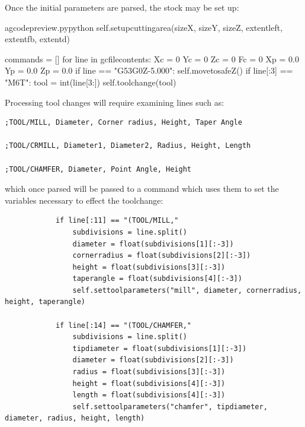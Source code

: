 \documentclass{ltxdoc}
\begin{document}
Once the initial parameters are parsed, the stock may be set up:

\lstset{firstnumber=\thegcpy}
\begin{writecode}{a}{gcodepreview.py}{python}
        self.setupcuttingarea(sizeX, sizeY, sizeZ, extentleft, extentfb, extentd)

        commands = []        
        for line in gcfilecontents:
            Xc = 0
            Yc = 0
            Zc = 0
            Fc = 0
            Xp = 0.0
            Yp = 0.0
            Zp = 0.0
            if line == "G53G0Z-5.000\n":
                 self.movetosafeZ()
            if line[:3] == "M6T":
                tool = int(line[3:])
                self.toolchange(tool)
\end{writecode}
\addtocounter{gcpy}{18}

Processing tool changes will require examining lines such as:

\begin{verbatim}
;TOOL/MILL, Diameter, Corner radius, Height, Taper Angle

;TOOL/CRMILL, Diameter1, Diameter2, Radius, Height, Length

;TOOL/CHAMFER, Diameter, Point Angle, Height
\end{verbatim}

\noindent which once parsed will be passed to a command which uses them to set the variables necessary to effect the toolchange:

\begin{verbatim}
            if line[:11] == "(TOOL/MILL,"
                subdivisions = line.split()
                diameter = float(subdivisions[1][:-3])
                cornerradius = float(subdivisions[2][:-3])
                height = float(subdivisions[3][:-3])
                taperangle = float(subdivisions[4][:-3])
                self.settoolparameters("mill", diameter, cornerradius, height, taperangle)

            if line[:14] == "(TOOL/CHAMFER,"
                subdivisions = line.split()
                tipdiameter = float(subdivisions[1][:-3])
                diameter = float(subdivisions[2][:-3])
                radius = float(subdivisions[3][:-3])
                height = float(subdivisions[4][:-3])
                length = float(subdivisions[4][:-3])
                self.settoolparameters("chamfer", tipdiameter, diameter, radius, height, length)

\end{verbatim}
\end{document}
